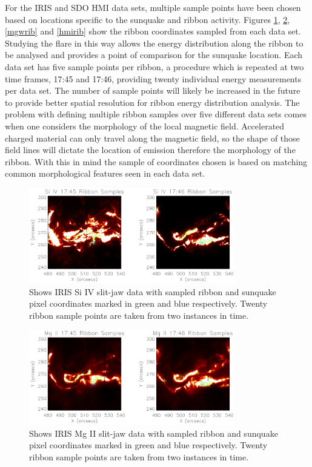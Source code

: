 For the IRIS and SDO HMI data sets, multiple sample points have been chosen based on locations specific to the sunquake and ribbon activity. Figures \ref{sirib}, \ref{mgrib}, \ref{mgwrib} and \ref{hmirib} show the ribbon coordinates sampled from each data set. Studying the flare in this way allows the energy distribution along the ribbon to be analysed and provides a point of comparison for the sunquake location. Each data set has five sample points per ribbon, a procedure which is repeated at two time frames, 17:45 and 17:46, providing twenty individual energy measurements per data set. The number of sample points will likely be increased in the future to provide better spatial resolution for ribbon energy distribution analysis. The problem with defining multiple ribbon samples over five different data sets comes when one considers the morphology of the local magnetic field. Accelerated charged material can only travel along the magnetic field, so the shape of those field lines will dictate the location of emission therefore the morphology of the ribbon. With this in mind the sample of coordinates chosen is based on matching common morphological features seen in each data set.

\begin{figure}[H]
  \begin{center}
  \includegraphics[width=0.8\textwidth]{29-Mar-14-SI-Ribbon-Coord-oplot}
  \end{center}
  \caption{Shows IRIS Si IV slit-jaw data with sampled ribbon and sunquake pixel coordinates marked in green and blue respectively. Twenty ribbon sample points are taken from two instances in time.}\label{sirib}
\end{figure}

\begin{figure}[H]
  \begin{center}
  \includegraphics[width=0.8\textwidth]{29-Mar-14-MG-Ribbon-Coord-oplot}
  \end{center}
  \caption{Shows IRIS Mg II slit-jaw data with sampled ribbon and sunquake pixel coordinates marked in green and blue respectively. Twenty ribbon sample points are taken from two instances in time.}\label{mgrib}
\end{figure}

